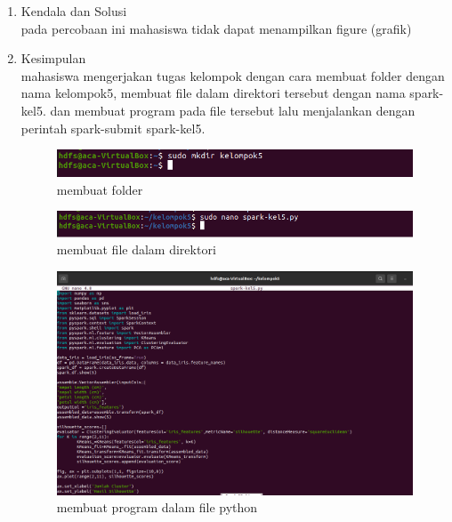 \newpage
{}
\begin{enumerate}
\item Kendala dan Solusi\\
pada percobaan ini mahasiswa tidak dapat menampilkan figure (grafik)
\item Kesimpulan \\
mahasiswa mengerjakan tugas kelompok dengan cara membuat folder dengan nama kelompok5, membuat file dalam direktori tersebut dengan nama spark-kel5. dan membuat program pada file tersebut lalu menjalankan dengan perintah spark-submit spark-kel5.

\begin{figure}[!ht]
\includegraphics[width=\textwidth]{TugasKelompok/Kelompok5/name-direktori}
\caption{membuat folder}
\label{gam:folder}
\end{figure}

\begin{figure}[!ht]
\includegraphics[width=\textwidth]{TugasKelompok/Kelompok5/file-name}
\caption{membuat file dalam direktori}
\label{gam:file-name}
\end{figure}

\begin{figure}[!ht]
\includegraphics[width=\textwidth]{TugasKelompok/Kelompok5/file-nano}
\caption{membuat program dalam file python}
\label{gam:file}
\end{figure}


\end{enumerate}
